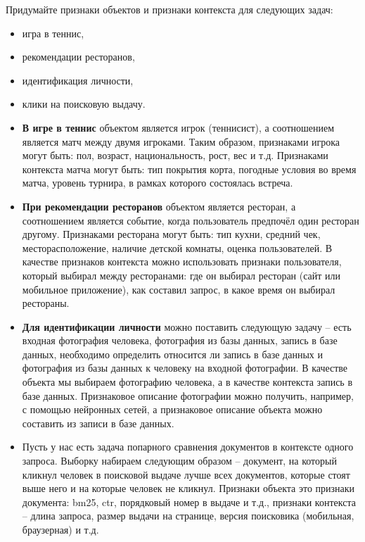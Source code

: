 \documentclass[12pt,a4paper]{article}
\begin{document}
\begin{vkProblem}
	Придумайте признаки объектов и признаки контекста для следующих задач:
	\begin{itemize}
		\item игра в теннис,
		\item рекомендации ресторанов,
		\item идентификация личности,
		\item клики на поисковую выдачу.
	\end{itemize}
\end{vkProblem}
\begin{esSolution}
	\begin{itemize}
		\item \textbf{В игре в теннис} объектом является игрок (теннисист), а соотношением является матч между двумя игроками. Таким образом, признаками игрока могут быть: пол, возраст, национальность, рост, вес и т.д. Признаками контекста матча могут быть: тип покрытия корта, погодные условия во время матча, уровень турнира, в рамках которого состоялась встреча.
		\item \textbf{При рекомендации ресторанов} объектом является ресторан, а соотношением является событие, когда пользователь предпочёл один ресторан другому. Признаками ресторана могут быть: тип кухни, средний чек, месторасположение, наличие детской комнаты, оценка пользователей. В качестве признаков контекста можно использовать признаки пользователя, который выбирал между ресторанами: где он выбирал ресторан (сайт или мобильное приложение), как составил запрос, в какое время он выбирал рестораны.
		\item \textbf{Для идентификации личности} можно поставить следующую задачу – есть входная фотография человека, фотография из базы данных, запись в базе данных, необходимо определить относится ли запись в базе данных и фотография из базы данных к человеку на входной фотографии. В качестве объекта мы выбираем фотографию человека, а в качестве контекста запись в базе данных. Признаковое описание фотографии можно получить, например, с помощью нейронных сетей, а признаковое описание объекта можно составить из записи в базе данных.
		\item Пусть у нас есть задача попарного сравнения документов в контексте одного запроса. Выборку набираем следующим образом – документ, на который кликнул человек в поисковой выдаче лучше всех документов, которые стоят выше него и на которые человек не кликнул. Признаки объекта это признаки документа: bm25, ctr, порядковый номер в выдаче и т.д., признаки контекста – длина запроса, размер выдачи на странице, версия поисковика (мобильная, браузерная) и т.д.
	\end{itemize}
\end{esSolution}
\end{document}
